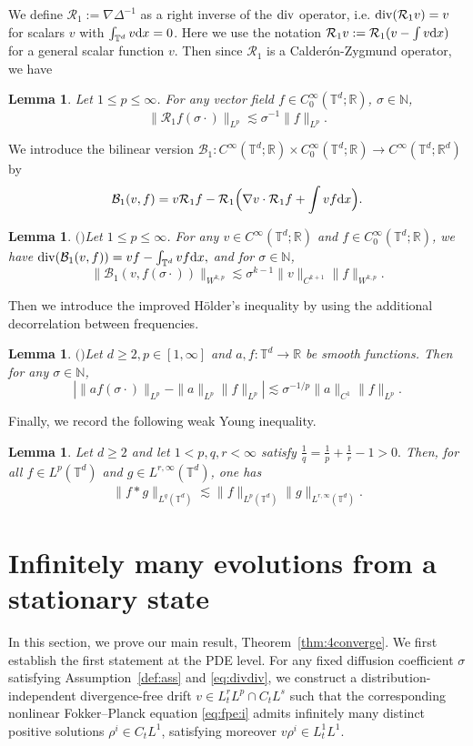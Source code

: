 \documentclass[UTF-8,reqno]{amsart}
\numberwithin{equation}{section}
\newtheorem{lemma}[theorem]{Lemma}
\theoremstyle{definition}
\def\({{\Big(}}
\def\){{\Big)}}
\def\dif{{\mathord{{\rm d}}}}
\def\geq{\geqslant}
\def\leq{\leqslant}
\def\div{\mathord{{\rm div}}}
\def\({{\Big(}}
\def\){{\Big)}}
\def\dif{{\mathord{{\rm d}}}}
\def\bl{\begin{lemma}}
\def\el{\end{lemma}}
\def\geq{\geqslant}
\def\leq{\leqslant}
\def\div{\mathord{{\rm div}}}
\begin{document}
 We define $\mathcal{R}_1:=\nabla\Delta^{-1}$ as a right
inverse of the $\div$ operator, i.e. $\div(\mathcal{R}_1v) = v$ for scalars $v$ with $\int_{\mathbb{T}^d} v\dif x = 0$.   Here we use the notation  $\mathcal{R}_1v:=\mathcal{R}_1(v-\int v\dif x)$ for a general scalar function $v$. Then  since $\mathcal{R}_1$ is a Calder\'on-Zygmund operator, we have 
\bl\label{bb_1}
 Let $1\leq p \leq\infty$. For any vector field 
$f \in C_0^\infty(\mathbb{T}^d; \mathbb{R})$, $\sigma\in\mathbb{N}$,
$$\|\mathcal{R}_1f(\sigma\cdot)\|_{ L^p}\lesssim\sigma^{-1} \| f\|_{ L^p}.$$
\el
We introduce the  bilinear version $\mathcal{B}_1: C^\infty(\mathbb{T}^d; \mathbb{R}) \times C_0^\infty(\mathbb{T}^d; \mathbb{R})\to C^\infty(\mathbb{T}^d; \mathbb{R}^{d})$  by $$\mathcal{B}_1(v,f)=v\mathcal{R}_1f-\mathcal{R}_1\(\nabla v\cdot\mathcal{R}_{1}f+\int vf\dif x\).$$

\bl$($\cite[Lemma 3.3]{BCDL21}$)$\label{bb1_1}
Let $1 \leq p \leq\infty$. For any $v \in C^\infty(\mathbb{T}^d; \mathbb{R})$ and $f\in C_0^\infty(\mathbb{T}^d; \mathbb{R})$, we have $\div(\mathcal{B}_1(v,f))=vf-\int_{\mathbb{T}^d}vf\dif x,$ and  for $\sigma\in\mathbb{N}$,
$$\|\mathcal{B}_1(v,f(\sigma\cdot))\|_{W^{k,p}}\lesssim\sigma^{k-1}\|v\|_{C^{k+1}}\|f\|_{W^{k,p}}.$$
\el 




 Then we introduce the improved H\"older’s inequality  by using the additional decorrelation between frequencies.
\bl$($\cite[Theorem B.1]{CL22}$)$\label{ihiot}
Let $d\geq2,p \in [1, \infty]$ and $a, f : \mathbb{T}^d \to \mathbb{R}$ be smooth functions. Then for any $\sigma\in\mathbb{N}$,
$$| \|a f(\sigma\cdot)\|_{L^p}-\|a\|_{L^p}\|f\|_{L^p} |\lesssim\sigma^{-1/p}\|a\|_{C^1}\|f\|_{L^p}.$$
\el


Finally, we record the following weak Young inequality.

\begin{lemma} \label{lem:weak-young}
Let $d\geq 2$ and let $1<p,q,r<\infty$ satisfy
$
\frac1q=\frac1p+\frac1r-1>0 .
$
Then, for all $f\in L^p(\mathbb{T}^d)$ and
$g\in L^{r,\infty}(\mathbb{T}^d)$, one has
\begin{align}
\|f*g\|_{L^q(\mathbb{T}^d)}
\lesssim
\|f\|_{L^p(\mathbb{T}^d)}
\|g\|_{L^{r,\infty}(\mathbb{T}^d)} .
\label{eq:hls}
\end{align}
\end{lemma}

\section{Infinitely many evolutions from a stationary state}\label{cogpss3}
In this section, we prove our main result, Theorem~\ref{thm:4converge}. 
We first establish the first statement at the PDE level. 
For any fixed diffusion coefficient $\sigma$ satisfying Assumption~\ref{def:ass} and \eqref{eq:divdiv}, we construct a distribution-independent divergence-free drift $v \in L^r_tL^p \cap C_tL^s$ 
such that the corresponding nonlinear Fokker--Planck equation \eqref{eq:fpe:i} admits infinitely many distinct positive solutions $\rho^i \in C_tL^1$, satisfying moreover $v\rho^i \in L^1_tL^1.$
\end{document}
